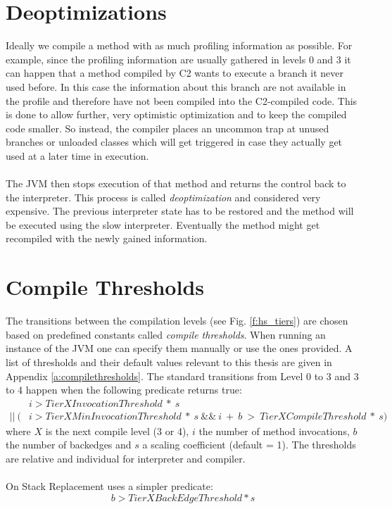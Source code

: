 \section{Deoptimizations}
\label{s:deoptimizations}
Ideally we compile a method with as much profiling information as possible.
For example, since the profiling information are usually gathered in levels 0 and 3 it can happen that a method compiled by C2 wants to execute a branch it never used before.
In this case the information about this branch are not available in the profile and therefore have not been compiled into the C2-compiled code.
This is done to allow further, very optimistic optimization and to keep the compiled code smaller. So instead, the compiler places an uncommon trap at unused branches or unloaded classes which will get triggered in case they actually get used at a later time in execution.
\\\\
The JVM then stops execution of that method and returns the control back to the interpreter. This process is called \textit{deoptimization} and considered very expensive. The previous interpreter state has to be restored and the method will be executed using the slow interpreter. Eventually the method might get recompiled with the newly gained information.

\section{Compile Thresholds}
\label{s:compilethresholds}
The transitions between the compilation levels (see Fig. \ref{f:hs_tiers}) are chosen based on predefined constants called \textit{compile thresholds}. When running an instance of the JVM one can specify them manually or use the ones provided. A list of thresholds and their default values relevant to this thesis are given in Appendix \ref{a:compilethresholds}.
The standard transitions from Level 0 to 3 and 3 to 4 happen when the following predicate returns true:
\begin{align*}
& i > TierXInvocationThreshold \ * \ s \\
 || \ (&i > TierXMinInvocationThreshold \ * \ s \ \&\& \ i \ + \ b \ > \ TierXCompileThreshold \ * \ s) 
\end{align*}
where $X$ is the next compile level (3 or 4), $i$ the number of method invocations, $b$ the number of backedges and $s$ a scaling coefficient (default = 1).
The thresholds are relative and individual for interpreter and compiler.
\\\\
On Stack Replacement uses a simpler predicate:
$$b > TierXBackEdgeThreshold * s$$

